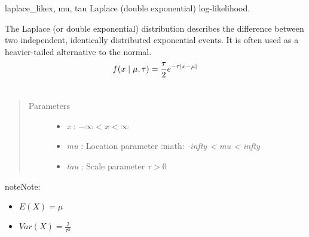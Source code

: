 \hypertarget{pymc.distributions.laplace_like}{}\begin{funcdesc}{laplace\_like}{x, mu, tau}
Laplace (double exponential) log-likelihood.

The Laplace (or double exponential) distribution describes the
difference between two independent, identically distributed exponential
events. It is often used as a heavier-tailed alternative to the normal.
\begin{gather}
\begin{split}f(x \mid \mu, \tau) = \frac{\tau}{2}e^{-\tau |x-\mu|}\end{split}\notag\\\begin{split}\end{split}\notag
\end{gather}\begin{quote}\begin{description}
\item[Parameters] \leavevmode\begin{itemize}
\item {} 
\emph{x} : $-\infty < x < \infty$

\item {} 
\emph{mu} : Location parameter :math: \emph{-infty \textless{} mu \textless{} infty}

\item {} 
\emph{tau} : Scale parameter $\tau > 0$

\end{itemize}

\end{description}\end{quote}

\begin{notice}{note}{Note:}\begin{itemize}
\item {} 
$E(X) = \mu$

\item {} 
$Var(X) = \frac{2}{\tau^2}$

\end{itemize}
\end{notice}
\end{funcdesc}

